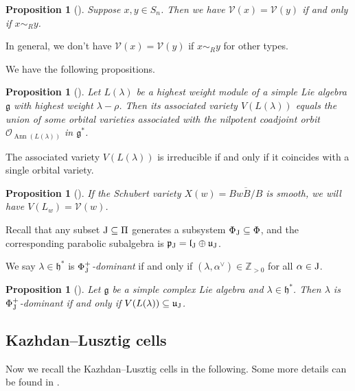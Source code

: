 \documentclass[11pt, reqno]{amsart}
\newcommand{\frg}{\mathfrak{g}}
\newcommand{\frh}{\mathfrak{h}}
\newcommand{\fru}{\mathfrak{u}}
\renewcommand{\subset}{\subseteq}
\newcommand{\Ann}{\operatorname{Ann}}
\newtheorem{prop}[Thm]{Proposition}
\theoremstyle{definition}
\numberwithin{equation}{section}
\begin{document}
\begin{prop}[{\cite[II. 9.8]{Sp82}}]\label{geometriccell}
    Suppose  $x,y\in S_n$. Then we have $\mathcal{V}(x)=\mathcal{V}(y)$ if and only if $x\sim_{R} y$.
\end{prop}

In general, we don't have $\mathcal{V}(x)=\mathcal{V}(y)$ if $x\sim_{R} y$ for other types.


We have the following  propositions.



\begin{prop}[\cite{Jo84}]
	Let $L(\lambda)$ be a highest weight module of a simple Lie algebra $\mathfrak{g}$ with highest weight $\lambda-\rho$. Then its associated variety $V(L(\lambda))$ equals the union of some orbital varieties associated with the nilpotent coadjoint orbit $\mathcal{O}_{\Ann(L(\lambda))}$ in $\mathfrak{g}^*$.
	
\end{prop}





The associated variety $V(L(\lambda))$ is  {irreducible}  {if and only if it coincides with a single orbital variety}.

\begin{prop}[{\cite[Cor. 4.3.2]{BoB3}}]\label{smoothequal}
	If the Schubert variety $X(w)=\overline{BwB/B}$ is smooth, we will have
$ V(L_w)=\mathcal{V}(w)$.	

\end{prop}


Recall that any subset ${\rm J}\subseteq\Pi$ generates a subsystem $\Phi_{\rm J}\subseteq\Phi$, and the corresponding parabolic subalgebra is $\mathfrak{p}_{\rm J}=\mathfrak{l}_{\rm J}\oplus\mathfrak{u}_{\rm J}$.

We say $\lambda\in\frh^*$ is \emph{$\Phi_{\rm J}^+$-dominant} if and only if $(\lambda,\alpha^\vee)\in\mathbb{Z}_{>0}$ for all $\alpha\in {\rm J}$. 

\begin{prop}[{\cite[Prop. 4.1]{BMXX}}]\label{Same}
    Let $\frg$ be a simple complex Lie algebra and $\lambda\in\frh^*$. Then $\lambda$ is $\Phi_{\rm J}^+$-dominant if and only if $V(L(\lambda))\subset\fru_{\rm J}$.
\end{prop}










\subsection{Kazhdan--Lusztig cells}\label{KL-cells}
Now we  recall the Kazhdan--Lusztig  cells in the following. Some more details can be found in \cite{Lus03}. 
\end{document}
